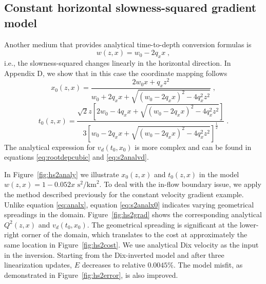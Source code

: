 \subsection{Constant horizontal slowness-squared gradient model}

Another medium that provides analytical time-to-depth conversion formulas is
\begin{equation}
\label{eq:consths20}
w (z,x) = w_0 - 2 q_x x\;,
\end{equation}
i.e., the slowness-squared changes linearly in the horizontal direction. In Appendix D, we show that in this case 
the coordinate mapping follows
\begin{equation}
\label{eq:s2analx0}
x_0 (z,x) = \frac{2 w_0 x + q_x z^2}{w_0 + 2 q_x x + \sqrt{(w_0 - 2 q_x x)^2 - 4 q_x^2 z^2}}\;,
\end{equation}
\begin{equation}
\label{eq:s2analt0}
t_0 (z,x) = \frac{\sqrt{2} z \left[ 2 w_0 - 4 q_x x + \sqrt{(w_0 - 2 q_x x)^2 - 4 q_x^2 z^2} 
\right]}{3 \left[ w_0 - 2 q_x x + \sqrt{(w_0 - 2 q_x x)^2 - 4 q_x^2 z^2} \right]^{\frac{1}{2}}}\;.
\end{equation}
The analytical expression for $v_d (t_0,x_0)$ is more complex and can be found in equations \ref{eq:rootdepcubic} 
and \ref{eq:s2analvd}.

In Figure~\ref{fig:hs2analy} we illustrate $x_0 (z,x)$ and $t_0 (z,x)$ in the model $w (z,x) = 1 - 0.052 x$ 
$\mbox{s}^2 / \mbox{km}^2$. To deal with the in-flow boundary issue, we apply the method described previously for 
the constant velocity gradient example. Unlike equation \ref{eq:analx}, equation \ref{eq:s2analx0} indicates 
varying geometrical spreadings in the domain. Figure~\ref{fig:hs2grad} shows the corresponding analytical 
$Q^2 (z,x)$ and $v_d (t_0,x_0)$. The geometrical spreading is significant at the lower-right corner of the domain, 
which translates to the cost at approximately the same location in Figure~\ref{fig:hs2cost}. We use analytical 
Dix velocity as the input in the inversion. Starting from the Dix-inverted model and after three linearization 
updates, $E$ decreases to relative $0.0045\%$.  
The model misfit, as demonstrated in Figure~\ref{fig:hs2error}, is also improved.

